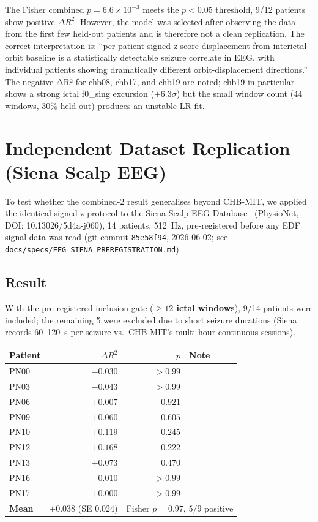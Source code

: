\documentclass[11pt]{article}
\begin{document}
The Fisher combined $p = 6.6 \times 10^{-3}$ meets the $p < 0.05$ threshold,
9/12 patients show positive $\Delta R^2$.
However, the model was selected after observing the data from the first few held-out
patients and is therefore not a clean replication.  The correct interpretation
is: ``per-patient signed z-score displacement from interictal orbit baseline
is a statistically detectable seizure correlate in EEG, with individual
patients showing dramatically different orbit-displacement directions.''
The negative ΔR² for chb08, chb17, and chb19 are noted; chb19 in particular
shows a strong ictal f0\_sing excursion ($+6.3\sigma$) but the small window count
(44 windows, 30\% held out) produces an unstable LR fit.

\section{Independent Dataset Replication (Siena Scalp EEG)}\label{sec:siena}

To test whether the combined-2 result generalises beyond CHB-MIT,
we applied the identical signed-z protocol to the Siena Scalp EEG
Database~\cite{siena} (PhysioNet, DOI: 10.13026/5d4a-j060),
14 patients, 512~Hz, pre-registered before any EDF signal data was read
(git commit \texttt{85e58f94}, 2026-06-02;
see \texttt{docs/specs/EEG\_SIENA\_PREREGISTRATION.md}).

\subsection*{Result}

With the pre-registered inclusion gate ({\bf $\geq 12$ ictal windows}),
9/14 patients were included; the remaining 5 were excluded due to short
seizure durations (Siena records 60--120~s per seizure vs.\ CHB-MIT's
multi-hour continuous sessions).

\begin{center}
\small
\begin{tabular}{lrrl}
\toprule
\textbf{Patient} & $\Delta R^2$ & $p$ & \textbf{Note} \\
\midrule
PN00 & $-0.030$ & $>0.99$ & \\
PN03 & $-0.043$ & $>0.99$ & \\
PN06 & $+0.007$ & $0.921$ & \\
PN09 & $+0.060$ & $0.605$ & \\
PN10 & $+0.119$ & $0.245$ & \\
PN12 & $+0.168$ & $0.222$ & \\
PN13 & $+0.073$ & $0.470$ & \\
PN16 & $-0.010$ & $>0.99$ & \\
PN17 & $+0.000$ & $>0.99$ & \\
\midrule
\textbf{Mean} & $+0.038$ (SE $0.024$) &
  \multicolumn{2}{l}{Fisher $p = 0.97$, $5/9$ positive} \\
\bottomrule
\end{tabular}
\end{center}
\end{document}
